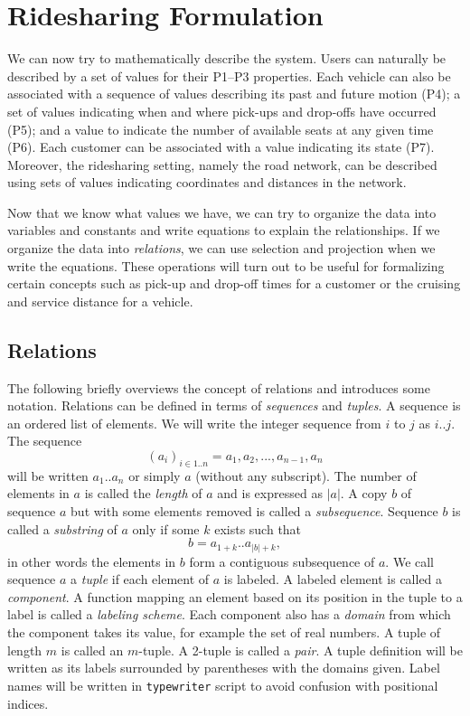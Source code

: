 \section{Ridesharing Formulation}
\label{ch:1:sec:ridesharing-formulation}
We can now try to mathematically describe the system.  Users can naturally be
described by a set of values for their P1--P3 properties.  Each vehicle can
also be associated with a sequence of values describing its past and future
motion (P4); a set of values indicating when and where pick-ups and drop-offs
have occurred (P5); and a value to indicate the number of available seats at
any given time (P6). Each customer can be associated with a value indicating
its state (P7). Moreover, the ridesharing setting, namely the road network, can
be described using sets of values indicating coordinates and distances in the
network.

Now that we know what values we have, we can try to organize the data into variables
and constants and write equations to explain the relationships. If we
organize the data into \emph{relations}, we can use selection and projection
when we write the equations. These operations will turn out to be useful for
formalizing certain concepts such as pick-up and drop-off times for a customer
or the cruising and service distance for a vehicle.

\subsection*{Relations}
The following briefly overviews the concept of relations and introduces some
notation.
Relations can be defined in terms of \emph{sequences} and \emph{tuples}.
A sequence is an ordered list of elements.
We will write the integer sequence from $i$ to
$j$ as $i..j$. The sequence
$$(a_i)_{i\in 1..n}=a_1,a_2,...,a_{n-1},a_n$$
will be written $a_1..a_n$ or simply $a$ (without any subscript).
The number of elements in $a$ is called the \emph{length}
of $a$ and is expressed as $|a|$.
A copy $b$ of sequence $a$ but with some elements removed is called
a \emph{subsequence}.
Sequence $b$ is called a \emph{substring} of $a$
only if some $k$ exists such that $$b=a_{1+k}..a_{|b|+k},$$
in other words the elements in $b$ form a contiguous subsequence of $a$.
We call
sequence $a$ a \emph{tuple} if each element of $a$ is labeled. A
labeled element is called a \emph{component}.
A function mapping an element based on its position in the tuple to a label
is called a \emph{labeling scheme}.
Each component also has a \emph{domain} from which the component takes its value,
for example the set of real numbers.
A tuple of length $m$ is called an $m$-tuple. A 2-tuple is called a
\emph{pair}.
A tuple definition will be written as its labels surrounded by parentheses with the
domains given. Label names will be written in \texttt{typewriter} script
to avoid confusion with positional indices.


